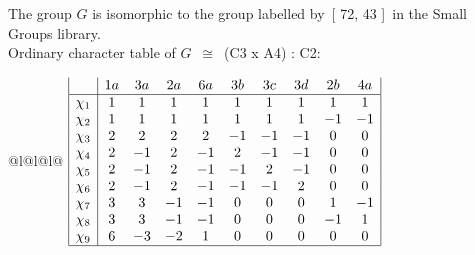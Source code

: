\documentclass[varwidth=\maxdimen,border=10]{standalone}
\begin{document}
The group $G$ is isomorphic to the group labelled by\ [ 72, 43 ]\ in the Small Groups library.\\
Ordinary character table of $G$\ $\cong$\ (C3 x A4) : C2:\\
\begin{center}
\begin{tabular}{@{}l@{}l@{}l@{}}
\hline
\(\begin{array}{|l|ccccccccc|}
  & 1a & 3a & 2a & 6a & 3b & 3c & 3d & 2b & 4a\\ \hline
\chi_{1} & 1 & 1 & 1 & 1 & 1 & 1 & 1 & 1 & 1\\
\chi_{2} & 1 & 1 & 1 & 1 & 1 & 1 & 1 & -1 & -1\\
\chi_{3} & 2 & 2 & 2 & 2 & -1 & -1 & -1 & 0 & 0\\
\chi_{4} & 2 & -1 & 2 & -1 & 2 & -1 & -1 & 0 & 0\\
\chi_{5} & 2 & -1 & 2 & -1 & -1 & 2 & -1 & 0 & 0\\
\chi_{6} & 2 & -1 & 2 & -1 & -1 & -1 & 2 & 0 & 0\\
\chi_{7} & 3 & 3 & -1 & -1 & 0 & 0 & 0 & 1 & -1\\
\chi_{8} & 3 & 3 & -1 & -1 & 0 & 0 & 0 & -1 & 1\\
\chi_{9} & 6 & -3 & -2 & 1 & 0 & 0 & 0 & 0 & 0\\
\hline
\end{array}\)\\
\end{tabular}
\end{center}
\end{document}
